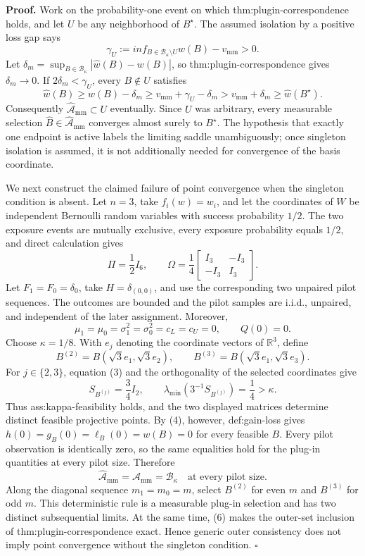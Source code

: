 \textbf{Proof.}
Work on the probability-one event on which thm:plugin-correspondence holds, and let \(U\) be any neighborhood of \(B^\star\).  The assumed isolation by a positive loss gap says
\[
 \gamma_U:=inf_{B\in\mathcal B_\kappa\setminus U}w(B)-v_{\mathrm{mm}}>0.
 \tag{1}
\]
Let \(\delta_m=\sup_{B\in\mathcal B_\kappa}|\widehat w(B)-w(B)|\), so thm:plugin-correspondence gives \(\delta_m\to0\).  If \(2\delta_m<\gamma_U\), every \(B\notin U\) satisfies
\[
 \widehat w(B)
 \ge w(B)-\delta_m
 \ge v_{\mathrm{mm}}+\gamma_U-\delta_m
 >v_{\mathrm{mm}}+\delta_m
 \ge\widehat w(B^\star).
 \tag{2}
\]
Consequently \(\widehat{\mathcal A}_{\mathrm{mm}}\subset U\) eventually.  Since \(U\) was arbitrary, every measurable selection \(\widehat B\in\widehat{\mathcal A}_{\mathrm{mm}}\) converges almost surely to \(B^\star\).  The hypothesis that exactly one endpoint is active labels the limiting saddle unambiguously; once singleton isolation is assumed, it is not additionally needed for convergence of the basis coordinate.

We next construct the claimed failure of point convergence when the singleton condition is absent.  Let \(n=3\), take \(f_i(w)=w_i\), and let the coordinates of \(W\) be independent Bernoulli random variables with success probability \(1/2\).  The two exposure events are mutually exclusive, every exposure probability equals \(1/2\), and direct calculation gives
\[
 \Pi=\frac12 I_6,
 \qquad
 \Omega=\frac14
 \begin{bmatrix}
 I_3&-I_3\\
 -I_3&I_3
 \end{bmatrix}.
 \tag{3}
\]
Let \(F_1=F_0=\delta_0\), take \(H=\delta_{(0,0)}\), and use the corresponding two unpaired pilot sequences.  The outcomes are bounded and the pilot samples are i.i.d., unpaired, and independent of the later assignment.  Moreover,
\[
 \mu_1=\mu_0=\sigma_1^2=\sigma_0^2=c_L=c_U=0,
 \qquad
 Q(0)=0.
 \tag{4}
\]
Choose \(\kappa=1/8\).  With \(e_j\) denoting the coordinate vectors of \(\mathbb R^3\), define
\[
 B^{(2)}=B(\sqrt3e_1,\sqrt3e_2),
 \qquad
 B^{(3)}=B(\sqrt3e_1,\sqrt3e_3).
\]
For \(j\in\{2,3\}\), equation (3) and the orthogonality of the selected coordinates give
\[
 S_{B^{(j)}}=\frac34 I_2,
 \qquad
 \lambda_{\min}\!\left(3^{-1}S_{B^{(j)}}\right)=\frac14>\kappa.
 \tag{5}
\]
Thus ass:kappa-feasibility holds, and the two displayed matrices determine distinct feasible projective points.  By (4), however, def:gain-loss gives \(h(0)=g_B(0)=\ell_B(0)=w(B)=0\) for every feasible \(B\).  Every pilot observation is identically zero, so the same equalities hold for the plug-in quantities at every pilot size.  Therefore
\[
 \widehat{\mathcal A}_{\mathrm{mm}}
 =\mathcal A_{\mathrm{mm}}
 =\mathcal B_\kappa
 \quad\text{at every pilot size}.
 \tag{6}
\]
Along the diagonal sequence \(m_1=m_0=m\), select \(B^{(2)}\) for even \(m\) and \(B^{(3)}\) for odd \(m\).  This deterministic rule is a measurable plug-in selection and has two distinct subsequential limits.  At the same time, (6) makes the outer-set inclusion of thm:plugin-correspondence exact.  Hence generic outer consistency does not imply point convergence without the singleton condition. \(\square\)